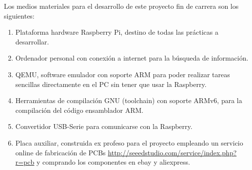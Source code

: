 Los medios materiales para el desarrollo de este proyecto fin de carrera son los siguientes:
\begin{enumerate}
  \item Plataforma hardware Raspberry Pi, destino de todas las prácticas a desarrollar.
  \item Ordenador personal con conexión a internet para la búsqueda de información.
  \item QEMU, software emulador con soporte ARM para poder realizar tareas sencillas
        directamente en el PC sin tener que usar la Raspberry.
  \item Herramientas de compilación GNU (toolchain) con soporte ARMv6, para la compilación
        del código ensamblador ARM.
  \item Convertidor USB-Serie para comunicarse con la Raspberry.
  \item Placa auxiliar, construida ex profeso para el proyecto empleando un servicio online de
        fabricación de PCBs
\textcolor{blue}{
  \href{http://seeedstudio.com/service/index.php?r=pcb}
  {http://seeedstudio.com/service/index.php?r=pcb}} y comprando los componentes en ebay y aliexpress.
\end{enumerate}

\chapterend
